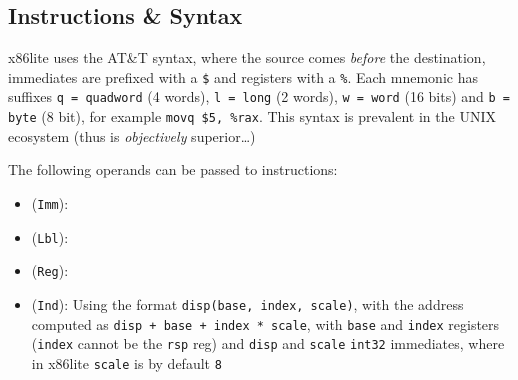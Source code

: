 \subsection{Instructions \& Syntax}
x86lite uses the AT\&T syntax, where the source comes \textit{before} the destination, immediates are prefixed with a \texttt{\$} and registers with a \texttt{\%}.
Each mnemonic has suffixes \texttt{q = quadword} (4 words), \texttt{l = long} (2 words), \texttt{w = word} (16 bits) and \texttt{b = byte} (8 bit),
for example \texttt{movq \$5, \%rax}. This syntax is prevalent in the UNIX ecosystem {\scriptsize (thus is \textit{objectively} superior\dots)}

The following operands can be passed to instructions:
\begin{itemize}
    \item {} (\texttt{Imm}):
    \item {} (\texttt{Lbl}):
    \item {} (\texttt{Reg}):
    \item {} (\texttt{Ind}): Using the format \texttt{disp(base, index, scale)}, with the address computed as \texttt{disp + base + index * scale},
          with \texttt{base} and \texttt{index} registers (\texttt{index} cannot be the \texttt{rsp} reg) and \texttt{disp} and \texttt{scale} \texttt{int32} immediates,
          where in x86lite \texttt{scale} is by default \texttt{8}
\end{itemize}
